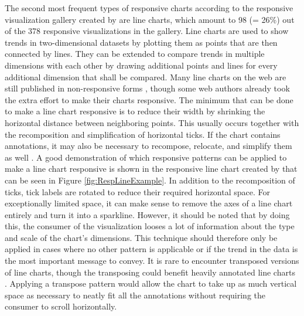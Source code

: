 The second most frequent types of responsive charts according to the responsive visualization gallery created by \cite{DesignPatternsTradeOffsRespVis} are line charts, which amount to 98 (= 26\%) out of the 378 responsive visualizations in the gallery. Line charts are used to show trends in two-dimensional datasets by plotting them as points that are then connected by lines. They can be extended to compare trends in multiple dimensions with each other by drawing additional points and lines for every additional dimension that shall be compared. Many line charts on the web are still published in non-responsive forms \parencite{HLine,HLine2}, though some web authors already took the extra effort to make their charts responsive. The minimum that can be done to make a line chart responsive is to reduce their width \parencite{RespRadialScatterHLine} by shrinking the horizontal distance between neighboring points. This usually occurs together with the recomposition and simplification of horizontal ticks. If the chart contains annotations, it may also be necessary to recompose, relocate, and simplify them as well \parencite{RespHLines,RespHLine,RespHBarHLine,RespHLineHStackedBar}. A good demonstration of which responsive patterns can be applied to make a line chart responsive is shown in the responsive line chart created by \cite{RespVis} that can be seen in Figure \ref{fig:RespLineExample}. In addition to the recomposition of ticks, tick labels are rotated to reduce their required horizontal space. For exceptionally limited space, it can make sense to remove the axes of a line chart entirely and turn it into a sparkline. However, it should be noted that by doing this, the consumer of the visualization looses a lot of information about the type and scale of the chart's dimensions. This technique should therefore only be applied in cases where no other pattern is applicable or if the trend in the data is the most important message to convey. It is rare to encounter transposed versions of line charts, though the transposing could benefit heavily annotated line charts \parencite{VLine}. Applying a transpose pattern would allow the chart to take up as much vertical space as necessary to neatly fit all the annotations without requiring the consumer to scroll horizontally.

